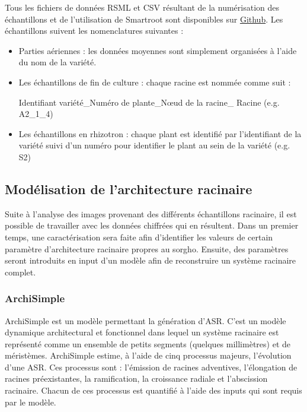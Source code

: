 Tous les fichiers de données RSML et CSV résultant de la numérisation des échantillons et de l'utilisation de Smartroot sont disponibles sur \href{https://github.com/ndegives/Memoire}{Github}.
Les échantillons suivent les nomenclatures suivantes :
\begin{itemize}
    \item Parties aériennes : les données moyennes sont simplement organisées à l'aide du nom de la variété.
    \item Les échantillons de fin de culture : chaque racine est nommée comme suit :
    \begin{center} Identifiant variété\_Numéro de plante\_N\oe ud de la racine\_ Racine (e.g. A2\_1\_4) \end{center}
    \item Les échantillons en rhizotron : chaque plant est identifié par l'identifiant de la variété suivi d'un numéro pour identifier le plant au sein de la variété (e.g. S2)
\end{itemize}

\subsection{Modélisation de l'architecture racinaire}

Suite à l'analyse des images provenant des différents échantillons racinaire, il est possible de travailler avec les données chiffrées qui en résultent.
Dans un premier temps, une caractérisation sera faite afin d'identifier les valeurs de certain paramètre d'architecture racinaire propres au sorgho.
Ensuite, des paramètres seront introduits en input d'un modèle afin de reconstruire un système racinaire complet.

\subsubsection{ArchiSimple}

ArchiSimple  \citep{pages_calibration_2014} est un modèle permettant la génération d'ASR.
C'est un modèle dynamique architectural et fonctionnel dans lequel un système racinaire est représenté comme un ensemble de petits segments (quelques millimètres) et de méristèmes.
ArchiSimple estime, à l'aide de cinq processus majeurs, l'évolution d'une ASR.
Ces processus sont : l'émission de racines adventives, l'élongation de racines préexistantes, la ramification, la croissance radiale et l'abscission racinaire.
Chacun de ces processus est quantifié à l'aide des inputs qui sont requis par le modèle.
\newline


